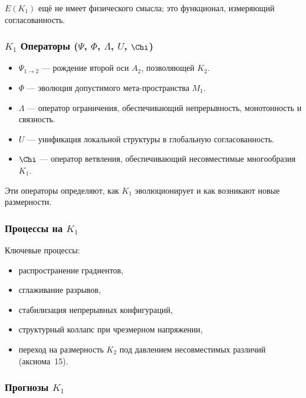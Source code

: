 $E(K_1)$ ещё не имеет физического смысла; это функционал, измеряющий
согласованность.

\subsubsection{\texorpdfstring{$K_1$}{K_1} Операторы (\texorpdfstring{$\Psi$}{\Psi}, \texorpdfstring{$\Phi$}{\Phi}, \texorpdfstring{$\Lambda$}{\Lambda}, \texorpdfstring{$U$}{U}, \texorpdfstring{$\Chi$}{\Chi})}

\begin{itemize}
    \item $\Psi_{1\to2}$ — рождение второй оси $A_2$, позволяющей
          $K_2$.
    \item $\Phi$ — эволюция допустимого мета-пространства $M_1$.
    \item $\Lambda$ — оператор ограничения, обеспечивающий непрерывность,
          монотонность и связность.
    \item $U$ — унификация локальной структуры в глобальную согласованность.
    \item $\Chi$ — оператор ветвления, обеспечивающий несовместимые
          многообразия $K_1$.
\end{itemize}

Эти операторы определяют, как $K_1$ эволюционирует и как возникают новые
размерности.

\subsubsection{Процессы на \texorpdfstring{$K_1$}{K_1}}

Ключевые процессы:
\begin{itemize}
    \item распространение градиентов,
    \item сглаживание разрывов,
    \item стабилизация непрерывных конфигураций,
    \item структурный коллапс при чрезмерном напряжении,
    \item переход на размерность $K_2$ под давлением
          несовместимых различий (аксиома~15).
\end{itemize}

\subsubsection{Прогнозы \texorpdfstring{$K_1$}{K_1}}

